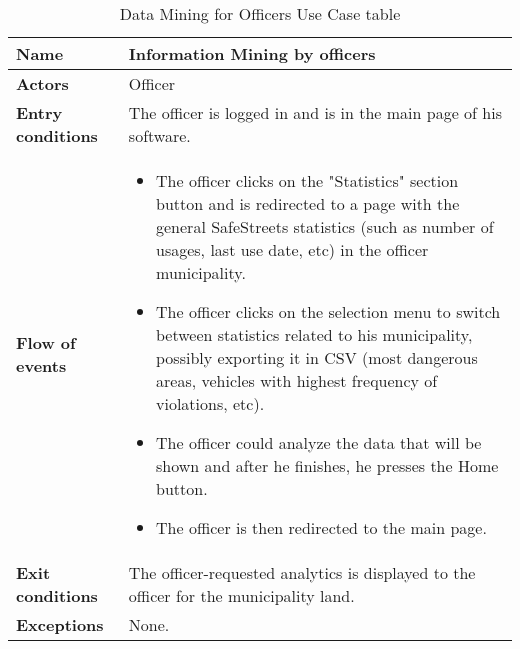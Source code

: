 \begin{table}[!htbp]
	\centering
	\begin{tabular}{lp{9cm}}
\bf\large Name&\bf\large Information Mining by officers\\
\hline
\hline
\bf Actors&Officer\\
\hline
\bf Entry conditions&The officer is logged in and is in the main page of his software.\\
\hline
\bf Flow of events&
\begin{itemize}

\item The officer clicks on the "Statistics" section button and is redirected to a page with the general SafeStreets statistics (such as number of usages, last use date, etc) in the officer municipality.

\item The officer clicks on the selection menu to switch between statistics related to his municipality, possibly exporting it in CSV (most dangerous areas, vehicles with highest frequency of violations, etc).

\item The officer could analyze the data that will be shown and after he finishes, he presses the Home button.

\item The officer is then redirected to the main page.

\end{itemize}
\\
\hline
\bf Exit conditions&The officer-requested analytics is displayed to the officer for the municipality land.\\
\hline
\bf Exceptions&None.
\\
\hline

\end{tabular}
\caption{Data Mining for Officers Use Case table}
 \label{tab:dataminingofficertab}
\end{table}